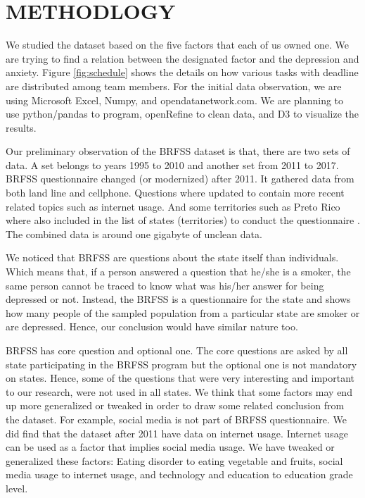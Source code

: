 \documentclass[letterpaper, 10 pt, conference]{ieeeconf}  %
\begin{document}
\section{METHODLOGY}
We studied the dataset based on the five factors that each of us owned one. 
We are trying to find a relation between the designated factor and the depression and anxiety.
Figure \ref{fig:schedule} shows the details on how various tasks with deadline are distributed among team members.
For the initial data observation, we are using Microsoft Excel, Numpy\cite{numpy}, and opendatanetwork.com\cite{odn}.
We are planning to use python/pandas\cite{pandas} to program, openRefine\cite{openrefine} to clean 
data, and D3\cite{d3} to visualize the results.

Our preliminary observation of the BRFSS\cite{brfss} dataset is that, there are two sets of data. 
A set belongs to years 1995 to 2010 and another set from 2011 to 2017. 
BRFSS questionnaire 
changed (or modernized) after 2011. It gathered data from both land line and cellphone. 
Questions where updated to contain more recent related topics such as internet usage. 
And some territories such as Preto Rico where also included in the list of states (territories) 
to conduct the questionnaire \cite{brfss}. 
The combined data is around one gigabyte of unclean data. 

We noticed that BRFSS are questions about the state itself than individuals. 
Which means that, if a person answered a question that he/she is a smoker, the same person cannot be traced to know
what was his/her answer for being depressed or not. 
Instead, the BRFSS is a questionnaire for the state and shows how many people of the sampled population 
from a particular state are smoker or are depressed. Hence, our conclusion would have similar nature too. 

BRFSS has core question and optional one. The core questions are asked by 
all state participating in the BRFSS program but the optional one is not mandatory on states. Hence, 
some of the questions that were very interesting and important to our research, were not used in all states. 
We think that some factors may end up more generalized or tweaked in order to draw some related conclusion
from the dataset. 
For example, social media is not part of BRFSS questionnaire. 
We did find that the dataset after 2011 have data on internet usage. Internet 
usage can be used as a factor that implies social media usage. We have tweaked or generalized these factors:
Eating disorder to eating vegetable and fruits, social media usage to internet usage, and technology and 
education to education grade level.
\end{document}
